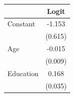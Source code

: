 \begin{tabular}{lc}
\toprule
 & Logit \\
\midrule
Constant & -1.153 \\
 & (0.615) \\
Age & -0.015 \\
 & (0.009) \\
Education & 0.168 \\
 & (0.035) \\
\bottomrule
\end{tabular}
